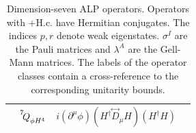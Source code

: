 \begin{table}[htbp]
\begin{tabular}{ c|c||c|c }
\\  \hhline{~|~||--}
\multicolumn{2}{c||}{} & $\op{7}{\phi H^4}{}$ & $i(\partial^\mu \phi) (H^\dagger \overset{\leftrightarrow}{D}{}_\mu H)(H^\dagger H)$
\\ 
\bottomrule
\end{tabular}
\caption{Dimension-seven ALP operators. Operators with $+ \text{H.c.}$ have Hermitian conjugates. The indices $p,r$ denote weak eigenstates.
$\sigma^I$ are the Pauli matrices and $\lambda^A$ are the Gell-Mann matrices. The labels of the operator classes contain a cross-reference to the corresponding unitarity bounds.\label{tab:ALPdim7}}
\end{table}